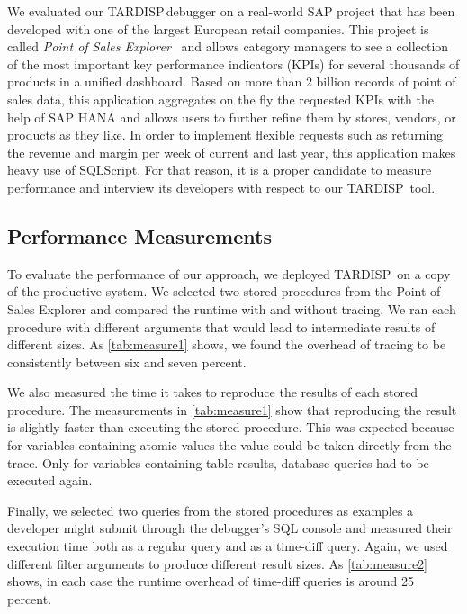 \documentclass[english,conference,final]{IEEEtran}
\newcommand{\todo}[2][]{\pdfmargincomment[author={#1}]{#2}}
\newcommand{\tool}{TAR\-DISP}
\begin{document}
We evaluated our \tool\,debugger on a real-world SAP project that has been developed with one of the largest European retail companies. 
This project is called \emph{Point of Sales Explorer}~\cite{plattner2015memory} and allows category managers to see a collection of the most important key performance indicators (KPIs) for several thousands of products in a unified dashboard.
Based on more than 2 billion records of point of sales data, this application aggregates on the fly the requested KPIs with the help of SAP HANA and allows users to further refine them by stores, vendors, or products as they like. 
In order to implement flexible requests such as returning the revenue and margin per week of current and last year, this application makes heavy use of SQLScript. 
For that reason, it is a proper candidate to measure performance and interview its developers with respect to our \tool\ tool. 

\subsection{Performance Measurements}

To evaluate the performance of our approach, we deployed \tool\ on a copy of the productive system.
We selected two stored procedures from the Point of Sales Explorer and compared the runtime with and without tracing.
We ran each procedure with different arguments that would lead to intermediate results of different sizes.
As \cref{tab:measure1} shows, we found the overhead of tracing to be consistently between six and seven percent.

We also measured the time it takes to reproduce the results of each stored procedure.
The measurements in \cref{tab:measure1} show that reproducing the result is slightly faster than executing the stored procedure.
This was expected because for variables containing atomic values the value could be taken directly from the trace.
Only for variables containing table results, database queries had to be executed again.

Finally, we selected two queries from the stored procedures as examples a developer might submit through the debugger's SQL console and measured their execution time both as a regular query and as a time-diff query.
Again, we used different filter arguments to produce different result sizes.
As \cref{tab:measure2} shows, in each case the runtime overhead of time-diff queries is around 25 percent.
\end{document}
